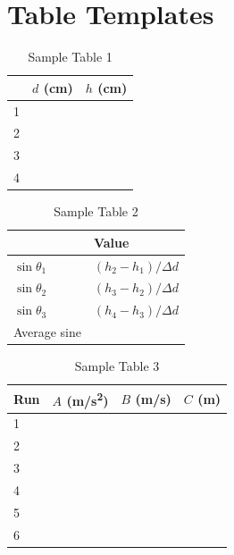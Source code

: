\section{Table Templates}
%
\begin{table}[ht!]
    \begin{center}
        \begin{tabular}{l | l | l}
            & $d$ (cm) & $h$ (cm) \\
            \hline
            1 & & \\
            2 & & \\
            3 & & \\
            4 & & \\
            \hline
        \end{tabular}
    \end{center}
    \caption{Sample Table 1}
\end{table}
%
\begin{table}[ht!]
    \begin{center}
        \begin{tabular}{l | l}
            & Value \\
            \hline
            $\sin \theta_{1}$ & $(h_{2} - h_{1}) / \Delta d$ \\
            $\sin \theta_{2}$ & $(h_{3} - h_{2}) / \Delta d$ \\
            $\sin \theta_{3}$ & $(h_{4} - h_{3}) / \Delta d$ \\
            \hline
            Average sine & \\
            \hline
        \end{tabular}
    \end{center}
    \caption{Sample Table 2}
\end{table}
%
\begin{table}[ht!]
    \begin{center}
        \begin{tabular}{l | l | l | l}
            \textbf{Run} & $A$ (m/s\textsuperscript{2}) & $B$ (m/s) & $C$ (m) \\
            \hline
            1 & & & \\
            2 & & & \\
            3 & & & \\
            \hline
            4 & & & \\
            5 & & & \\
            6 & & & \\
            \hline
        \end{tabular}
    \end{center}
    \caption{Sample Table 3}
\end{table}
